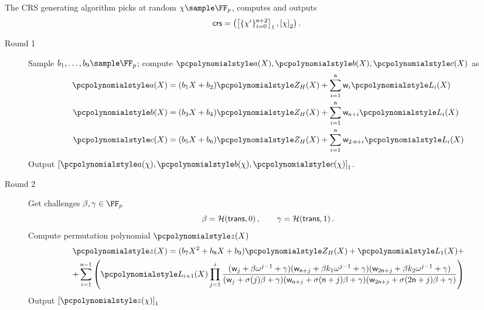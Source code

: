 \let\accentvec\vec \documentclass[runningheads,10pt]{llncs}
\begin{document}
The CRS generating algorithm picks at random $\chi \sample \FF_p$, computes
and outputs
\[
	\mathsf{crs} = \left(\left[\{\chi^i\}_{i = 0}^{\mathsf{n} + 2}\right]_{1},
	\left[\chi\right]_{2} \right).
\]

\begin{description}
	\item[Round 1] 
	Sample $b_1, \ldots, b_9 \sample \FF_p$; compute $\p{a}(X), \p{b}(X), \p{c}(X)$ as 
	\begin{align*}
		\p{a}(X) &= (b_1 X + b_2)\p{Z_H}(X) + \sum_{i = 1}^{\numberofconstrains} \wit_i \lag_i(X) \\
		\p{b}(X) &= (b_3 X + b_4)\p{Z_H}(X) + \sum_{i = 1}^{\numberofconstrains} \wit_{\numberofconstrains + i} \lag_i(X) \\
		\p{c}(X) &= (b_5 X + b_6)\p{Z_H}(X) + \sum_{i = 1}^{\numberofconstrains} \wit_{2 \cdot \numberofconstrains + i} \lag_i(X) 
	\end{align*}
	Output $\gone{\p{a}(\chi), \p{b}(\chi), \p{c}(\chi)}$.
	
	\item[Round 2]
	Get challenges $\beta, \gamma \in \FF_p$
	\[
		\beta = \mathcal{H}(\mathsf{trans}, 0)\,, \qquad \gamma = \mathcal{H}(\mathsf{trans}, 1)\,.
	\]
	Compute permutation polynomial $\p{z}(X)$
	\begin{multline*}
		\p{z}(X) = (b_7 X^2 + b_8 X + b_9)\p{Z_H}(X) + \lag_1(X) + \\
			+ \sum_{i = 1}^{\numberofconstrains - 1} 
			\left(\lag_{i + 1} (X) \prod_{j = 1}^{i} 
			\frac{
			(\wit_j +\beta \omega^{j - 1} + \gamma)(\wit_{\numberofconstrains + j} + \beta k_1 \omega^{j - 1} + \gamma)(\wit_{2 \numberofconstrains + j} +\beta k_2 \omega^{j- 1} + \gamma)}
			{(\wit_j+\sigma(j) \beta + \gamma)(\wit_{\numberofconstrains + j} + \sigma(\numberofconstrains + j)\beta + \gamma)(\wit_{2 \numberofconstrains + j} + \sigma(2 \numberofconstrains + j)\beta + \gamma)}\right)
	\end{multline*}
	Output $\gone{\p{z}(\chi)}$
		

\end{description}
\end{document}
